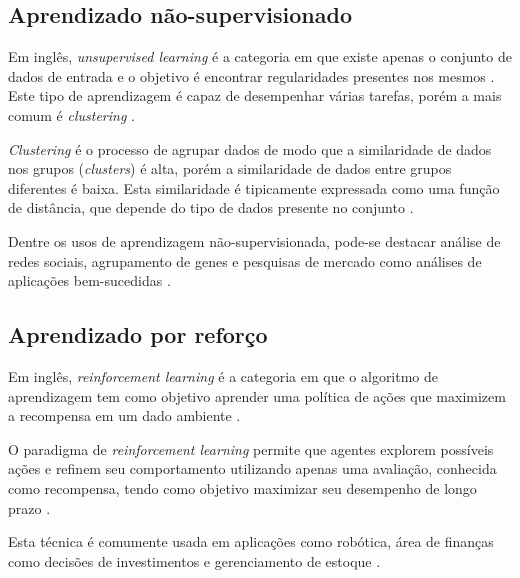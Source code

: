 \subsection{Aprendizado não-supervisionado}

Em inglês, \textit{unsupervised learning} é a categoria em que existe apenas o conjunto de dados de entrada e o objetivo é encontrar regularidades presentes nos mesmos \cite{alpaydin2020introduction}. Este tipo de aprendizagem é capaz de desempenhar várias tarefas, porém a mais comum é \textit{clustering} \cite{8527529}.

\textit{Clustering} é o processo de agrupar dados de modo que a similaridade de dados nos grupos (\textit{clusters}) é alta, porém a similaridade de dados entre grupos diferentes é baixa. Esta similaridade é tipicamente expressada como uma função de distância, que depende do tipo de dados presente no conjunto \cite{8527529}.

Dentre os usos de aprendizagem não-supervisionada, pode-se destacar análise de redes sociais, agrupamento de genes e pesquisas de mercado como análises de aplicações bem-sucedidas \cite{8527529}.

\subsection{Aprendizado por reforço}

Em inglês, \textit{reinforcement learning} é a categoria em que o algoritmo de aprendizagem tem como objetivo aprender uma política de ações que maximizem a recompensa em um dado ambiente \cite{alpaydin2020introduction}.

O paradigma de \textit{reinforcement learning} permite que agentes explorem possíveis ações e refinem seu comportamento utilizando apenas uma avaliação, conhecida como recompensa, tendo como objetivo maximizar seu desempenho de longo prazo \cite{8527529}.

Esta técnica é comumente usada em aplicações como robótica, área de finanças como decisões de investimentos e gerenciamento de estoque \cite{8527529}.






